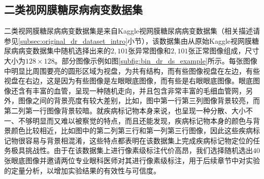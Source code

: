 \subsection{二类视网膜糖尿病病变数据集}\label{subsec:bin_dr_ds}
二类视网膜糖尿病病变数据集是来自Kaggle视网膜糖尿病病变数据集（相关描述请参见\ref{subsec:original_dr_dataset_intro}小节），该数据集由从原始Kaggle视网膜糖尿病病变数据集中随机选择出来的$2,101$张异常图像和$2,101$张正常图像组成，尺寸大小为$128\times 128$。部分图像示例如图\ref{subfig:bin_dr_ds_example}所示。每张图像中明显比周围要亮的圆形区域为视盘，为共有结构，而有些图像视盘在左边，有些视盘在右边，这是因为有些图像是左眼眼底图像，而有些是右眼眼底图像。眼底图像还含有丰富的血管，呈现一种随机走向，并且包含非常丰富的毛细血管网，另外，图像之间的背景亮度有较大差别，比如，图中第一行第三列图像背景较亮，而第二列第一行图像背景较暗。就疾病标记物本身来说，也呈现一种分散、大小不一、不够明显而又难以被察觉的特点，而且还能发现，疾病标记物本身的颜色与背景颜色比较相近，比如图中的第二列第三行和第一列第三行图像，因此这些疾病标记物很容易与背景相混淆，这些特点都表明在该数据集上完成疾病标记物定位的任务极具挑战性。由于在该数据集上进行像素级标注代价高昂，我们选择随机选出$40$张眼底图像并邀请两位专业眼科医师对其进行像素级标注，用于后续章节中对实验的定量分析，以增加实验结果的有效性与可信度。




